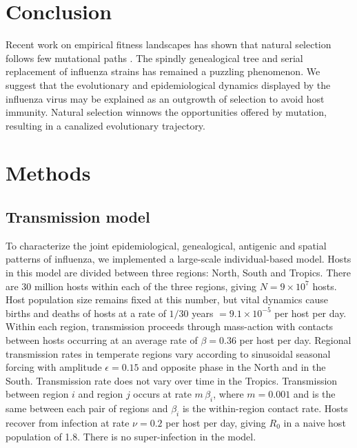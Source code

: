 \documentclass[11pt,oneside,letterpaper]{article}
\begin{document}
\section*{Conclusion}

Recent work on empirical fitness landscapes has shown that natural selection follows few mutational paths \cite{Weinreich06}.  The spindly genealogical tree and serial replacement of influenza strains has remained a puzzling phenomenon.  We suggest that the evolutionary and epidemiological dynamics displayed by the influenza virus may be explained as an outgrowth of selection to avoid host immunity.  Natural selection winnows the opportunities offered by mutation, resulting in a canalized evolutionary trajectory.

\section*{Methods}

\subsection*{Transmission model}

To characterize the joint epidemiological, genealogical, antigenic and spatial patterns of influenza, we implemented a large-scale individual-based model.  Hosts in this model are divided between three regions: North, South and Tropics.  There are 30 million hosts within each of the three regions, giving $N = 9 \times 10^{7}$ hosts.  Host population size remains fixed at this number, but vital dynamics cause births and deaths of hosts at a rate of $1 / 30$ years $= 9.1 \times 10^{-5}$ per host per day.  Within each region, transmission proceeds through mass-action with contacts between hosts occurring at an average rate of $\beta = 0.36$ per host per day.  Regional transmission rates in temperate regions vary according to sinusoidal seasonal forcing with amplitude $\epsilon = 0.15$ and opposite phase in the North and in the South.  Transmission rate does not vary over time in the Tropics.  Transmission between region $i$ and region $j$ occurs at rate $m\,\beta_i$, where $m=0.001$ and is the same between each pair of regions and $\beta_i$ is the within-region contact rate.   Hosts recover from infection at rate $\nu = 0.2$ per host per day, giving $R_0$ in a naive host population of 1.8.  There is no super-infection in the model.
\end{document}

